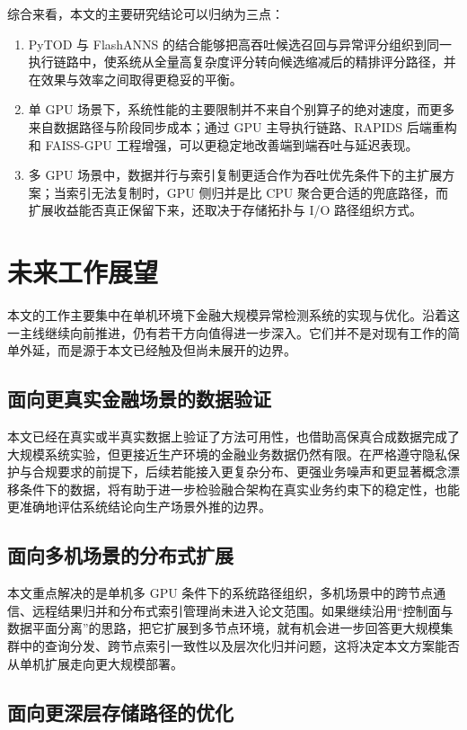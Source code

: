 综合来看，本文的主要研究结论可以归纳为三点：
\begin{enumerate}
  \item PyTOD 与 FlashANNS 的结合能够把高吞吐候选召回与异常评分组织到同一执行链路中，使系统从全量高复杂度评分转向候选缩减后的精排评分路径，并在效果与效率之间取得更稳妥的平衡。
  \item 单 GPU 场景下，系统性能的主要限制并不来自个别算子的绝对速度，而更多来自数据路径与阶段同步成本；通过 GPU 主导执行链路、RAPIDS 后端重构和 FAISS-GPU 工程增强，可以更稳定地改善端到端吞吐与延迟表现。
  \item 多 GPU 场景中，数据并行与索引复制更适合作为吞吐优先条件下的主扩展方案；当索引无法复制时，GPU 侧归并是比 CPU 聚合更合适的兜底路径，而扩展收益能否真正保留下来，还取决于存储拓扑与 I/O 路径组织方式。
\end{enumerate}

\section{未来工作展望}

本文的工作主要集中在单机环境下金融大规模异常检测系统的实现与优化。沿着这一主线继续向前推进，仍有若干方向值得进一步深入。它们并不是对现有工作的简单外延，而是源于本文已经触及但尚未展开的边界。

\subsection{面向更真实金融场景的数据验证}

本文已经在真实或半真实数据上验证了方法可用性，也借助高保真合成数据完成了大规模系统实验，但更接近生产环境的金融业务数据仍然有限。在严格遵守隐私保护与合规要求的前提下，后续若能接入更复杂分布、更强业务噪声和更显著概念漂移条件下的数据，将有助于进一步检验融合架构在真实业务约束下的稳定性，也能更准确地评估系统结论向生产场景外推的边界。

\subsection{面向多机场景的分布式扩展}

本文重点解决的是单机多 GPU 条件下的系统路径组织，多机场景中的跨节点通信、远程结果归并和分布式索引管理尚未进入论文范围。如果继续沿用“控制面与数据平面分离”的思路，把它扩展到多节点环境，就有机会进一步回答更大规模集群中的查询分发、跨节点索引一致性以及层次化归并问题，这将决定本文方案能否从单机扩展走向更大规模部署。

\subsection{面向更深层存储路径的优化}

